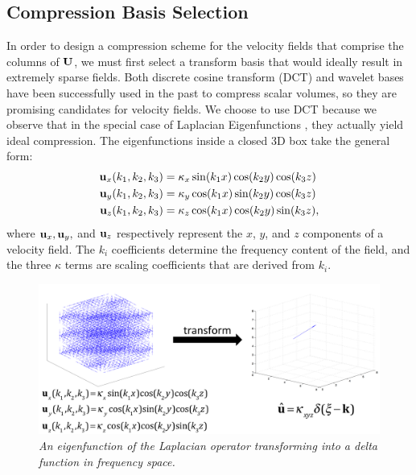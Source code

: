 \subsection{Compression Basis Selection}
\label{sec:laplacian}

In order to design a compression scheme for the velocity fields that comprise the columns of $\mathbf{U}$, we must first select a transform basis that would ideally result in extremely sparse fields. Both discrete cosine transform (DCT) \cite{Yeo:1995:VRD} and wavelet \cite{guthe2002,treib12turbulence} bases have been successfully used in the past to compress scalar volumes, so they are promising candidates for velocity fields. We choose to use DCT because we observe that in the special case of Laplacian Eigenfunctions \cite{deWitt:2012}, they actually yield ideal compression. The eigenfunctions inside a closed 3D box take the general form:
\begin{equation}
\begin{split}
\mathbf{u}_x(k_1,k_2,k_3) &= \kappa_x \sin(k_1 x) \cos(k_2 y) \cos(k_3 z) \\
\mathbf{u}_y(k_1,k_2,k_3) &= \kappa_y \cos(k_1 x) \sin(k_2 y) \cos(k_3 z) \\
\mathbf{u}_z(k_1,k_2,k_3) &= \kappa_z \cos(k_1 x) \cos(k_2 y) \sin(k_3 z),
\end{split}
\end{equation}
where $\mathbf{u}_x, \mathbf{u}_y,$ and $\mathbf{u}_z$ respectively represent the $x$, $y$, and $z$ components of a velocity field. The $k_i$ coefficients determine the frequency content of the field, and the three $\kappa$ terms are scaling coefficients that are derived from $k_i$.

\begin{figure}
\label{fig:laplacians}
\includegraphics[width=\textwidth]{chap4/figures/laplacian_sparsity.png}
\caption{\em An eigenfunction of the Laplacian operator transforming into a delta function in frequency space.}
\end{figure}

